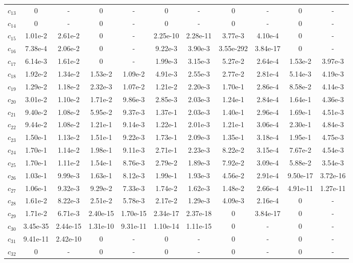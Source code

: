\begin{table}[p]
{\begin{tabular}{lcc@{\hspace{16pt}}cc@{\hspace{16pt}}cc@{\hspace{16pt}}cc@{\hspace{16pt}}cc}
$c_{13}$ & 0 & - & 0 & - & 0 & - & 0 & - & 0 & - \\
$c_{14}$ & 0 & - & 0 & - & 0 & - & 0 & - & 0 & - \\
$c_{15}$ & 1.01e-2 & 2.61e-2 & 0 & - & 2.25e-10 & 2.28e-11 & 3.77e-3 & 4.10e-4 & 0 & - \\
$c_{16}$ & 7.38e-4 & 2.06e-2 & 0 & - & 9.22e-3 & 3.90e-3 & 3.55e-292 & 3.84e-17 & 0 & - \\
$c_{17}$ & 6.14e-3 & 1.61e-2 & 0 & - & 1.99e-3 & 3.15e-3 & 5.27e-2 & 2.64e-4 & 1.53e-2 & 3.97e-3 \\
$c_{18}$ & 1.92e-2 & 1.34e-2 & 1.53e-2 & 1.09e-2 & 4.91e-3 & 2.55e-3 & 2.77e-2 & 2.81e-4 & 5.14e-3 & 4.19e-3 \\
$c_{19}$ & 1.29e-2 & 1.18e-2 & 2.32e-3 & 1.07e-2 & 1.21e-2 & 2.20e-3 & 1.70e-1 & 2.86e-4 & 8.58e-2 & 4.14e-3 \\
$c_{20}$ & 3.01e-2 & 1.10e-2 & 1.71e-2 & 9.86e-3 & 2.85e-3 & 2.03e-3 & 1.24e-1 & 2.84e-4 & 1.64e-1 & 4.36e-3 \\
$c_{21}$ & 9.40e-2 & 1.08e-2 & 5.95e-2 & 9.37e-3 & 1.37e-1 & 2.03e-3 & 1.40e-1 & 2.96e-4 & 1.69e-1 & 4.51e-3 \\
$c_{22}$ & 9.44e-2 & 1.08e-2 & 1.21e-1 & 9.14e-3 & 1.22e-1 & 2.01e-3 & 1.21e-1 & 3.06e-4 & 2.30e-1 & 4.84e-3 \\
$c_{23}$ & 1.50e-1 & 1.13e-2 & 1.51e-1 & 9.22e-3 & 1.73e-1 & 2.09e-3 & 1.35e-1 & 3.18e-4 & 1.95e-1 & 4.75e-3 \\
$c_{24}$ & 1.70e-1 & 1.14e-2 & 1.98e-1 & 9.11e-3 & 2.71e-1 & 2.23e-3 & 8.22e-2 & 3.15e-4 & 7.67e-2 & 4.54e-3 \\
$c_{25}$ & 1.70e-1 & 1.11e-2 & 1.54e-1 & 8.76e-3 & 2.79e-2 & 1.89e-3 & 7.92e-2 & 3.09e-4 & 5.88e-2 & 3.54e-3 \\
$c_{26}$ & 1.03e-1 & 9.99e-3 & 1.63e-1 & 8.12e-3 & 1.99e-1 & 1.93e-3 & 4.56e-2 & 2.91e-4 & 9.50e-17 & 3.72e-16 \\
$c_{27}$ & 1.06e-1 & 9.32e-3 & 9.29e-2 & 7.33e-3 & 1.74e-2 & 1.62e-3 & 1.48e-2 & 2.66e-4 & 4.91e-11 & 1.27e-11 \\
$c_{28}$ & 1.61e-2 & 8.22e-3 & 2.51e-2 & 5.78e-3 & 2.17e-2 & 1.29e-3 & 4.09e-3 & 2.16e-4 & 0 & - \\
$c_{29}$ & 1.71e-2 & 6.71e-3 & 2.40e-15 & 1.70e-15 & 2.34e-17 & 2.37e-18 & 0 & 3.84e-17 & 0 & - \\
$c_{30}$ & 3.45e-35 & 2.44e-15 & 1.31e-10 & 9.31e-11 & 1.10e-14 & 1.11e-15 & 0 & - & 0 & - \\
$c_{31}$ & 9.41e-11 & 2.42e-10 & 0 & - & 0 & - & 0 & - & 0 & - \\
$c_{32}$ & 0 & - & 0 & - & 0 & - & 0 & - & 0 & - \\
\bottomrule
\end{tabular}}
\endgroup
\end{table}
\clearpage
